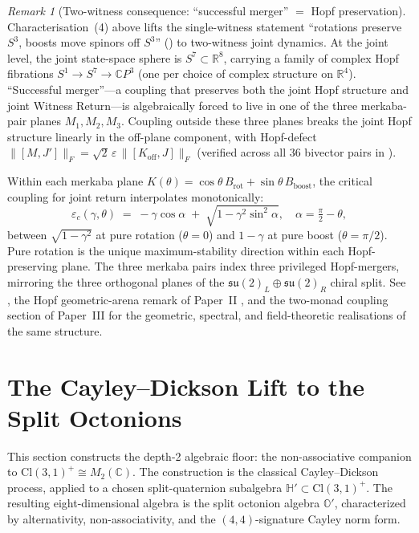 \documentclass[11pt,a4paper]{article}
\theoremstyle{plain}
\theoremstyle{definition}
\theoremstyle{remark}
\newtheorem{remark}[theorem]{Remark}
\numberwithin{equation}{section}
\providecommand{\Cl}{\mathrm{Cl}}
\providecommand{\R}{\mathbb{R}}
\providecommand{\C}{\mathbb{C}}
\providecommand{\Hp}{\mathbb{H}'}
\providecommand{\Os}{\mathbb{O}'}
\providecommand{\fk}[1]{\mathfrak{#1}}
\begin{document}
\begin{remark}[Two-witness consequence: ``successful merger''
\(=\) Hopf preservation]
\label{rmk:two-witness-merger}
Characterisation~(4) above lifts the single-witness statement
``rotations preserve $S^3$, boosts move spinors off $S^3$''
(\cite[Rmk.~9.4]{echo-rh}) to two-witness joint dynamics.  At
the joint level, the joint state-space sphere is
$S^7 \subset \R^8$, carrying a family of complex Hopf fibrations
$S^1 \to S^7 \to \C P^3$ (one per choice of complex structure
on $\R^4$).  ``Successful merger''---a coupling that preserves
both the joint Hopf structure and joint Witness Return---is
algebraically forced to live in one of the three merkaba-pair
planes $M_1, M_2, M_3$.  Coupling outside these three planes
breaks the joint Hopf structure linearly in the off-plane
component, with Hopf-defect
$\|[M, J']\|_F = \sqrt{2}\,\varepsilon\,\|[K_{\text{off}}, J]\|_F$
(verified across all $36$ bivector pairs in
\cite{two-witness-return}).

Within each merkaba plane $K(\theta) = \cos\theta\, B_{\text{rot}}
+ \sin\theta\, B_{\text{boost}}$, the critical coupling for joint
return interpolates monotonically:
\[
  \varepsilon_c(\gamma, \theta) \;=\; -\gamma \cos\alpha
  \;+\; \sqrt{1 - \gamma^2 \sin^2\alpha},
  \quad \alpha = \tfrac{\pi}{2} - \theta,
\]
between $\sqrt{1 - \gamma^2}$ at pure rotation
($\theta = 0$) and $1 - \gamma$ at pure boost
($\theta = \pi/2$).  Pure rotation is the unique
maximum-stability direction within each Hopf-preserving plane.
The three merkaba pairs index three privileged Hopf-mergers,
mirroring the three orthogonal planes of the
$\fk{su}(2)_L \oplus \fk{su}(2)_R$ chiral split.  See
\cite{two-witness-return},
the Hopf geometric-arena remark of Paper~II \cite{echo-rh}, and
the two-monad coupling section of Paper~III \cite{paper-III-monad} for
the geometric, spectral, and field-theoretic
realisations of the same structure.
\end{remark}

\section{The Cayley--Dickson Lift to the Split Octonions}
\label{sec:cd-lift}

This section constructs the depth-2 algebraic floor: the
non-associative companion to $\Cl(3,1)^+ \cong M_2(\C)$.  The
construction is the classical Cayley--Dickson process, applied to
a chosen split-quaternion subalgebra $\Hp \subset \Cl(3,1)^+$.
The resulting eight-dimensional algebra is the split octonion
algebra $\Os$, characterized by alternativity, non-associativity,
and the $(4,4)$-signature Cayley norm form.
\end{document}
